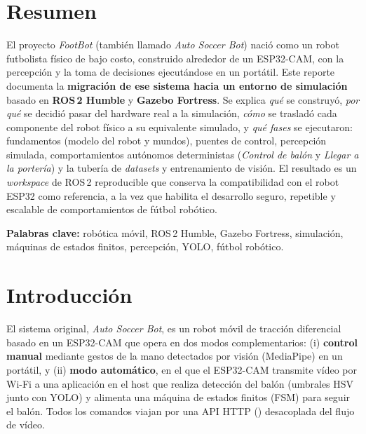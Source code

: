 \documentclass[11pt,a4paper]{article}
\newcommand{\code}[1]{\texttt{\detokenize{#1}}}
\begin{document}
\clearpage
{\hypersetup{linkcolor=darkgray}\tableofcontents}
\thispagestyle{fancy}
\clearpage

\section*{Resumen}

El proyecto \textit{FootBot} (también llamado \textit{Auto Soccer Bot}) nació como
un robot futbolista físico de bajo costo, construido alrededor de un ESP32\mbox{-}CAM,
con la percepción y la toma de decisiones ejecutándose en un portátil. Este reporte
documenta la \textbf{migración de ese sistema hacia un entorno de simulación} basado
en \textbf{ROS\,2 Humble} y \textbf{Gazebo Fortress}. Se explica \emph{qué} se construyó,
\emph{por qué} se decidió pasar del hardware real a la simulación, \emph{cómo} se trasladó
cada componente del robot físico a su equivalente simulado, y \emph{qué fases} se ejecutaron:
fundamentos (modelo del robot y mundos), puentes de control, percepción simulada,
comportamientos autónomos deterministas (\emph{Control de balón} y \emph{Llegar a la portería})
y la tubería de \emph{datasets} y entrenamiento de visión. El resultado es un \emph{workspace}
de ROS\,2 reproducible que conserva la compatibilidad con el robot ESP32 como referencia,
a la vez que habilita el desarrollo seguro, repetible y escalable de comportamientos de
fútbol robótico.

\medskip
\noindent\textbf{Palabras clave:} robótica móvil, ROS\,2 Humble, Gazebo Fortress, simulación,
máquinas de estados finitos, percepción, YOLO, fútbol robótico.

\section{Introducción}
\label{sec:intro}

El sistema original, \textit{Auto Soccer Bot}, es un robot móvil de tracción diferencial
basado en un ESP32\mbox{-}CAM que opera en dos modos complementarios: (i) \textbf{control manual}
mediante gestos de la mano detectados por visión (MediaPipe) en un portátil, y
(ii) \textbf{modo automático}, en el que el ESP32\mbox{-}CAM transmite vídeo por Wi\mbox{-}Fi a una
aplicación en el host que realiza detección del balón (umbrales HSV junto con YOLO) y alimenta
una máquina de estados finitos (FSM) para seguir el balón. Todos los comandos viajan por una
API HTTP (\code{/move}) desacoplada del flujo de vídeo.
\end{document}
